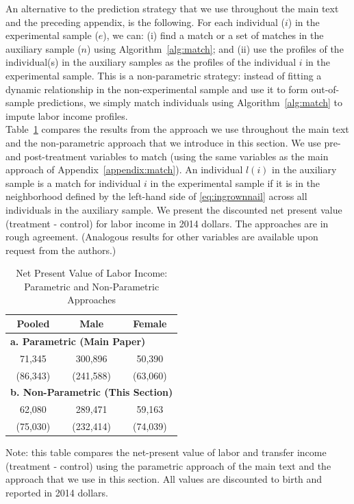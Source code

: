 \noindent An alternative to the prediction strategy that we use throughout the main text and the preceding appendix, is the following. For each individual ($i$) in the experimental sample ($e$), we can: (i) find a match or a set of matches in the auxiliary sample ($n$) using Algorithm~\ref{alg:match}; and (ii) use the profiles of the individual(s) in the auxiliary samples as the profiles of the individual $i$ in the experimental sample. This is a non-parametric strategy: instead of fitting a dynamic relationship in the non-experimental sample and use it to form out-of-sample predictions, we simply match individuals using Algorithm~\ref{alg:match} to impute labor income profiles.\\

\noindent Table~\ref{table:nvpli} compares the results from the approach we use throughout the main text and the non-parametric approach that we introduce in this section. We use pre- and post-treatment variables to match (using the same variables as the main approach of Appendix~\ref{appendix:match}). An individual $l(i)$ in the auxiliary sample is a match for individual $i$ in the experimental sample if it is in the neighborhood defined by the left-hand side of \eqref{eq:ingrownnail} across all individuals in the auxiliary sample. We present the discounted net present value (treatment - control) for labor income in 2014 dollars. The approaches are in rough agreement. (Analogous results for other variables are available upon request from the authors.)\\

\begin{table}[H]
\begin{threeparttable}
\caption{Net Present Value of Labor Income: Parametric and Non-Parametric Approaches}
\label{table:nvpli}
\centering
\begin{tabular}{ccc} \toprule
Pooled & Male & Female   \\ \midrule
\multicolumn{3}{l}{\textbf{a. Parametric (Main Paper)}} \\
71,345 & 300,896 & 50,390 \\
(86,343) & (241,588) & (63,060)\\
\multicolumn{3}{l}{\textbf{b. Non-Parametric (This Section)}} \\
62,080 & 289,471 & 59,163 \\
(75,030) & (232,414) & (74,039) \\ \bottomrule
\end{tabular}
\begin{tablenotes}
\footnotesize
\item Note: this table compares the net-present value of labor and transfer income (treatment - control) using the parametric approach of the main text and the approach that we use in this section. All values are discounted to birth and reported in 2014 dollars.
\end{tablenotes}
\end{threeparttable}
\end{table}

